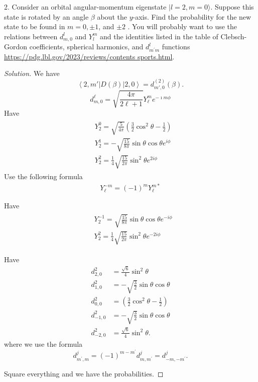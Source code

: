 \begin{problem}
	2. Consider an orbital angular-momentum eigenstate $|l=2, m=0\rangle$. Suppose this state is rotated by an angle $\beta$ about the $y$-axis. Find the probability for the new state to be found in $m=0, \pm 1$, and $\pm 2$ . You will probably want to use the relations between $d_{m, 0}^l$ and $Y_l^m$ and the identities listed in the table of Clebsch-Gordon coefficients, spherical harmonics, and $d_{m^{\prime} m}^l$ functions \url{https://pdg.lbl.gov/2023/reviews/contents sports.html}.
\end{problem}
\begin{proof}[Solution]
	We have
	\[
		\left\langle 2, m' \right| D(\beta) \left| 2, 0 \right\rangle 
		= d^{(2)}_{m', 0}(\beta)
	.\]
	\[
		d_{m, 0}^{\ell}=\sqrt{\frac{4 \pi}{2 \ell+1}} Y_{\ell}^m {e^{-\imath m \phi}}
	\]
	Have
	\begin{align}
\begin{aligned}
& Y_2^0=\sqrt{\frac{5}{4 \pi}}\left(\frac{3}{2} \cos ^2 \theta-\frac{1}{2}\right) \\
& Y_2^1=-\sqrt{\frac{15}{8 \pi}} \sin \theta \cos \theta e^{i \phi} \\
& Y_2^2=\frac{1}{4} \sqrt{\frac{15}{2 \pi}} \sin ^2 \theta e^{2 i \phi}
\end{aligned}
\end{align}
Use the following formula
\begin{align}
Y_{\ell}^{-m}=(-1)^m Y_{\ell}^{m *}
\end{align}

Have
\begin{align}
\begin{aligned}
& Y_2^{-1}=\sqrt{\frac{15}{8 \pi}} \sin \theta \cos \theta e^{-i \phi} \\
& Y_2^2=\frac{1}{4} \sqrt{\frac{15}{2 \pi}} \sin ^2 \theta e^{-2 i \phi}
\end{aligned}
\end{align}

Have
\begin{align*}
	d_{2,0}^2&=\frac{\sqrt{6}}{4} \sin ^2 \theta\\
	d_{1,0}^2&=-\sqrt{\frac{3}{2}} \sin \theta \cos \theta\\
	d_{0,0}^2&=\left(\frac{3}{2} \cos ^2 \theta-\frac{1}{2}\right)\\
	d_{-1,0}^2&=-\sqrt{\frac{3}{2}} \sin \theta \cos \theta\\
	d_{-2,0}^2&=\frac{\sqrt{6}}{4} \sin ^2 \theta
.\end{align*}
where we use the formula
\[
	d_{m^{\prime}, m}^j=(-1)^{m-m^{\prime}} d_{m, m^{\prime}}^j=d_{-m,-m^{\prime}}^j
.\] 

Square everything and we have the probabilities.

\end{proof}



